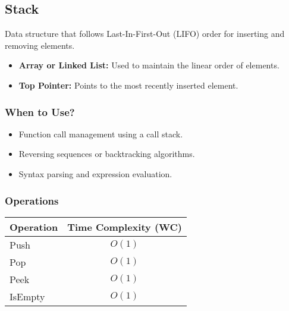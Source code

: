 \subsection{Stack}
\begin{summary}
    Data structure that follows Last-In-First-Out (LIFO) order for inserting and removing elements.
    \begin{itemize}
        \item \textbf{Array or Linked List:} Used to maintain the linear order of elements.
        \item \textbf{Top Pointer:} Points to the most recently inserted element.
    \end{itemize}    
\end{summary}

\subsubsection{When to Use?}
\begin{summary}
    \begin{itemize}
        \item Function call management using a call stack.
        \item Reversing sequences or backtracking algorithms.
        \item Syntax parsing and expression evaluation.
    \end{itemize}
\end{summary}

\subsubsection{Operations}
\begin{summary}
    \begin{center}
        \begin{tabular}{lc}
            \toprule
            \textbf{Operation} & \textbf{Time Complexity (WC)} \\
            \midrule
            Push   & $O(1)$ \\
            Pop    & $O(1)$ \\
            Peek   & $O(1)$ \\
            IsEmpty & $O(1)$ \\
            \bottomrule
        \end{tabular}
    \end{center}
\end{summary}


